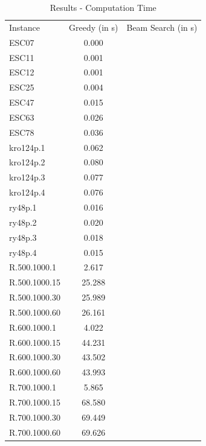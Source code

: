 \documentclass[]{article}
\begin{document}

	\begin{table}[htb]
		\begin{tabular}{lcc}
			Instance & Greedy (in s) & Beam Search (in s) \\
			ESC07 & 0.000 & \\
			ESC11 & 0.001 & \\
			ESC12 & 0.001 & \\
			ESC25 & 0.004 & \\
			ESC47 & 0.015 & \\
			ESC63 & 0.026 & \\
			ESC78 & 0.036 & \\
			kro124p.1 & 0.062 & \\
			kro124p.2 & 0.080 & \\
			kro124p.3 & 0.077 & \\
			kro124p.4 & 0.076 & \\
			ry48p.1   & 0.016 & \\
			ry48p.2   & 0.020 & \\
			ry48p.3   & 0.018 & \\
			ry48p.4   & 0.015 & \\
			R.500.1000.1  & 2.617 & \\
			R.500.1000.15 & 25.288 & \\
			R.500.1000.30 & 25.989 & \\
			R.500.1000.60 & 26.161 & \\
			R.600.1000.1  & 4.022 & \\
			R.600.1000.15 & 44.231 & \\
			R.600.1000.30 & 43.502 & \\
			R.600.1000.60 & 43.993 & \\
			R.700.1000.1  & 5.865 & \\
			R.700.1000.15 & 68.580 & \\
			R.700.1000.30 & 69.449 & \\
			R.700.1000.60 & 69.626 & \\
		\end{tabular}
		\caption{Results - Computation Time}
		\label{table:results_time}
	\end{table}





    \newpage

	 
	
\end{document}
